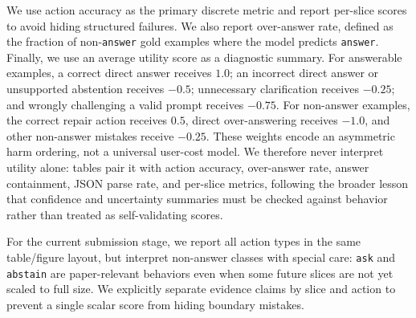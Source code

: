 We use action accuracy as the primary discrete metric and report per-slice scores to avoid hiding structured failures. We also report over-answer rate, defined as the fraction of non-\texttt{answer} gold examples where the model predicts \texttt{answer}. Finally, we use an average utility score as a diagnostic summary. For answerable examples, a correct direct answer receives $1.0$; an incorrect direct answer or unsupported abstention receives $-0.5$; unnecessary clarification receives $-0.25$; and wrongly challenging a valid prompt receives $-0.75$. For non-answer examples, the correct repair action receives $0.5$, direct over-answering receives $-1.0$, and other non-answer mistakes receive $-0.25$. These weights encode an asymmetric harm ordering, not a universal user-cost model. We therefore never interpret utility alone: tables pair it with action accuracy, over-answer rate, answer containment, JSON parse rate, and per-slice metrics, following the broader lesson that confidence and uncertainty summaries must be checked against behavior rather than treated as self-validating scores\citep{guo-etal-2017-calibration,kadavath-etal-2022-language,kuhn-etal-2023-semantic}.

For the current submission stage, we report all action types in the same table/figure layout, but interpret non-answer classes with special care: \texttt{ask} and \texttt{abstain} are paper-relevant behaviors even when some future slices are not yet scaled to full size. We explicitly separate evidence claims by slice and action to prevent a single scalar score from hiding boundary mistakes.
